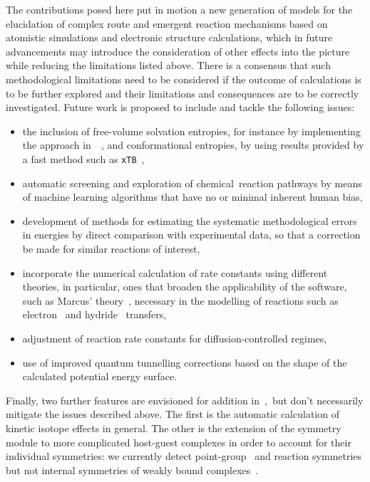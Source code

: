 The contributions posed here put in motion a new generation
of models for the elucidation of complex route and emergent reaction mechanisms
based on atomistic simulations and electronic structure calculations,
which in future advancements may introduce the consideration of other effects into the picture
while reducing the limitations listed above.
There is a consensus that such methodological limitations need
to be considered if the outcome of calculations is to be further explored
and their limitations and consequences are to be correctly investigated.
Future work is proposed to include and tackle the following issues:
%
\begin{itemize}
	\item the inclusion of free-volume solvation entropies, for instance
	      by implementing the approach in~\citeauthor{Garza_2019}~\cite{Garza_2019},
	      and conformational entropies, by using results provided by a fast method such as \texttt{xTB}~\cite{Bannwarth_2020},
	\item automatic screening and exploration of chemical~reaction pathways
	      by means of machine learning algorithms that have no or minimal inherent human bias,
	\item development of methods for estimating the systematic methodological errors in energies
	      by direct comparison with experimental data, so that a correction be made for similar reactions of interest,
	\item incorporate the numerical calculation of rate constants using different theories,
	      in particular, ones that broaden the applicability of the software,
	      such as Marcus' theory~\cite{Miller_1984,Nobel_1992,Nikbin_2012},
	      necessary in the modelling of reactions
	      such as electron~\cite{Miller_1984} and hydride~\cite{Nikbin_2012} transfers,
	\item adjustment of reaction rate constants for diffusion-controlled regimes,
	\item use of improved quantum tunnelling corrections based on the shape of the calculated potential energy surface.
\end{itemize}

Finally, two further features are envisioned for addition in~\overreact{},~but don't necessarily mitigate the issues described above.
The first is the automatic calculation of kinetic isotope effects in general.
The other is the extension of the symmetry module to more complicated host-guest complexes
in order to account for their individual symmetries:
we currently detect point-group~\cite{Beruski_2013} and reaction symmetries but not internal symmetries
of weakly bound complexes~\cite{Gilson_2010}.
